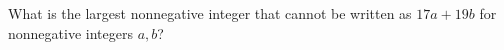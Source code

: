 What is the largest nonnegative integer that cannot be written as $17a+19b$ for nonnegative integers $a,b$?
